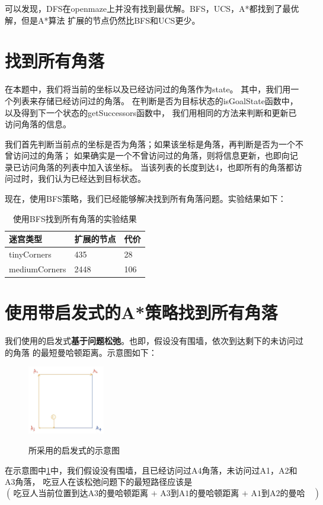 \documentclass{article}
\begin{document}
可以发现，DFS在openmaze上并没有找到最优解。BFS，UCS，A*都找到了最优解，但是A*算法
扩展的节点仍然比BFS和UCS更少。

\section{找到所有角落}
在本题中，我们将当前的坐标以及已经访问过的角落作为state。
其中，我们用一个列表来存储已经访问过的角落。
在判断是否为目标状态的isGoalState函数中，以及得到下一个状态的getSuccessors函数中，
我们用相同的方法来判断和更新已访问角落的信息。

我们首先判断当前点的坐标是否为角落；如果该坐标是角落，再判断是否为一个不曾访问过的角落；
如果确实是一个不曾访问过的角落，则将信息更新，也即向记录已访问角落的列表中加入该坐标。
当该列表的长度到达4，也即所有的角落都访问过时，我们认为已经达到目标状态。

现在，使用BFS策略，我们已经能够解决找到所有角落问题。实验结果如下：
\begin{table}[H]
	\centering
	\caption{使用BFS找到所有角落的实验结果}
	\begin{tabular}{lll}
		\hline
	迷宫类型          & 扩展的节点 & 代价  \\ \hline
	tinyCorners   & 435   & 28  \\
	mediumCorners & 2448  & 106\\ \hline
	\end{tabular}
	\end{table}

\section{使用带启发式的A*策略找到所有角落}
我们使用的启发式\textbf{基于问题松弛}。也即，假设没有围墙，依次到达剩下的未访问过的角落
的最短曼哈顿距离。示意图如下：
\begin{figure}[H]
	\centering
	{\includegraphics[width=0.3\textwidth]{image//启发式示意图.jpg}} \label{Hfunc}
	\caption{所采用的启发式的示意图}
\end{figure}

在示意图中\ref{Hfunc}中，我们假设没有围墙，且已经访问过A4角落，未访问过A1，A2和A3角落，
吃豆人在该松弛问题下的最短路径应该是
\[ (\,\text{吃豆人当前位置到达A3的曼哈顿距离 + A3到A1的曼哈顿距离 + A1到A2的曼哈顿距离}\,) \]
\end{document}
